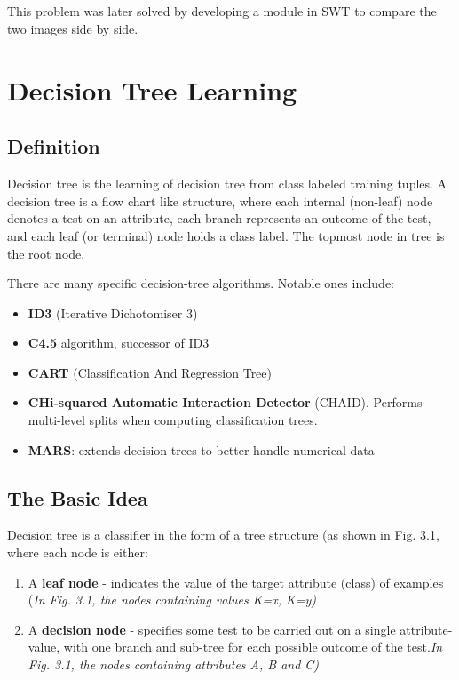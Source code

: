 \documentclass[12pt]{report}
\begin{document}
\paragraph{}This problem was later solved by developing a module in SWT to compare the two images side by side.
\pagebreak
\chapter{Decision Tree Learning}

\section{Definition}


Decision tree is the learning of decision tree from class labeled training tuples. A decision tree is a flow chart like structure, where each internal (non-leaf) node denotes a test on an attribute, each branch represents an outcome of the test, and each leaf (or terminal) node holds a class label. The topmost node in tree is the root node.

There are many specific decision-tree algorithms. Notable ones include:

\begin{itemize}
\item{\textbf{ID3} (Iterative Dichotomiser 3)}
\item{\textbf{C4.5} algorithm, successor of ID3}
\item{\textbf{CART} (Classification And Regression Tree)}
\item{\textbf{CHi-squared Automatic Interaction Detector }(CHAID). Performs multi-level splits when computing classification trees.}
\item{\textbf{MARS}: extends decision trees to better handle numerical data}
\end{itemize}


\section{The Basic Idea}

Decision tree is a classifier in the form of a tree structure (as shown in Fig. 3.1, where each node is either:
\begin{enumerate}
\item{A \textbf{leaf node} - indicates the value of the target attribute (class) of examples} (\textit{In Fig. 3.1, the nodes containing values K=x, K=y)}
\item{A \textbf{decision node} - specifies some test to be carried out on a single attribute-value, with one branch and sub-tree for each possible outcome of the test.\textit{In Fig. 3.1, the nodes containing attributes A, B and C)}}

\end{enumerate}
\end{document}
